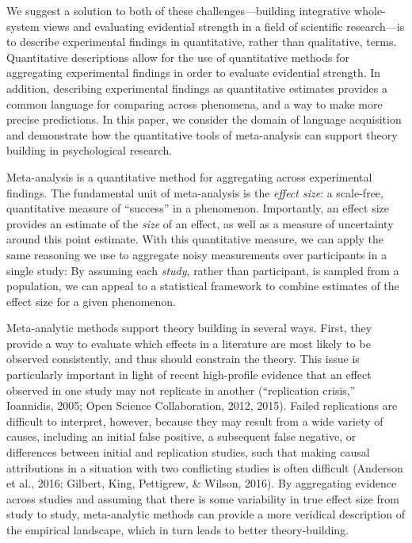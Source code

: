 \documentclass[english,floatsintext,man]{apa6}
\begin{document}
We suggest a solution to both of these challenges---building integrative
whole-system views and evaluating evidential strength in a field of
scientific research---is to describe experimental findings in
quantitative, rather than qualitative, terms. Quantitative descriptions
allow for the use of quantitative methods for aggregating experimental
findings in order to evaluate evidential strength. In addition,
describing experimental findings as quantitative estimates provides a
common language for comparing across phenomena, and a way to make more
precise predictions. In this paper, we consider the domain of language
acquisition and demonstrate how the quantitative tools of meta-analysis
can support theory building in psychological research.

Meta-analysis is a quantitative method for aggregating across
experimental findings. The fundamental unit of meta-analysis is the
\emph{effect size}: a scale-free, quantitative measure of
\enquote{success} in a phenomenon. Importantly, an effect size provides
an estimate of the \emph{size} of an effect, as well as a measure of
uncertainty around this point estimate. With this quantitative measure,
we can apply the same reasoning we use to aggregate noisy measurements
over participants in a single study: By assuming each \emph{study},
rather than participant, is sampled from a population, we can appeal to
a statistical framework to combine estimates of the effect size for a
given phenomenon.

Meta-analytic methods support theory building in several ways. First,
they provide a way to evaluate which effects in a literature are most
likely to be observed consistently, and thus should constrain the
theory. This issue is particularly important in light of recent
high-profile evidence that an effect observed in one study may not
replicate in another (``replication crisis,'' Ioannidis, 2005; Open
Science Collaboration, 2012, 2015). Failed replications are difficult to
interpret, however, because they may result from a wide variety of
causes, including an initial false positive, a subsequent false
negative, or differences between initial and replication studies, such
that making causal attributions in a situation with two conflicting
studies is often difficult (Anderson et al., 2016; Gilbert, King,
Pettigrew, \& Wilson, 2016). By aggregating evidence across studies and
assuming that there is some variability in true effect size from study
to study, meta-analytic methods can provide a more veridical description
of the empirical landscape, which in turn leads to better
theory-building.
\end{document}
